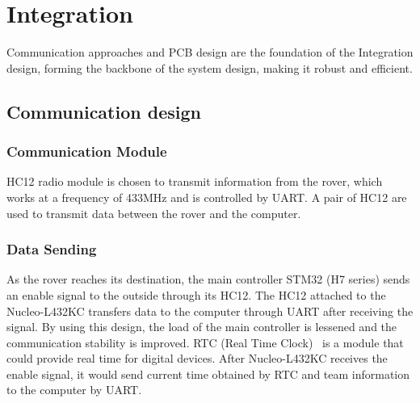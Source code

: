 \documentclass{article}
\begin{document}
\section{Integration}
Communication approaches and PCB design are the foundation of the Integration design, forming the backbone of the system design, making it robust and efficient.

    \subsection{Communication design}
    
        \subsubsection{Communication Module}
        HC12 radio module is chosen to transmit information from the rover, which works at a frequency of 433MHz and is controlled by UART. A pair of HC12 are used to transmit data between the rover and the computer.
        
        \subsubsection{Data Sending}
        As the rover reaches its destination, the main controller STM32 (H7 series) sends an enable signal to the outside through its HC12. The HC12 attached to the Nucleo-L432KC transfers data to the computer through UART after receiving the signal. By using this design, the load of the main controller is lessened and the communication stability is improved. RTC (Real Time Clock)~\cite{rtc} is a module that could provide real time for digital devices. After Nucleo-L432KC receives the enable signal, it would send current time obtained by RTC and team information to the computer by UART.
        
\end{document}
